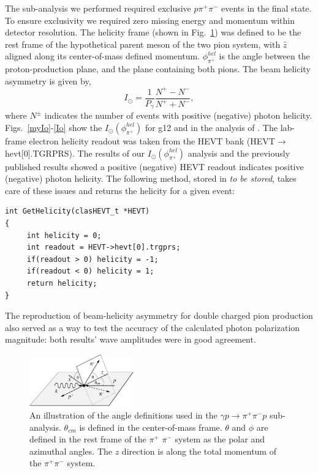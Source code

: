 The sub-analysis we performed required exclusive $p \pi^+ \pi^-$ events in the final state. To ensure exclusivity we required zero missing energy and momentum within detector resolution. The helicity frame (shown in Fig.~\ref{ioplane}) was defined to be the rest frame of the hypothetical parent meson of the two pion system, with  $\hat{z}$ aligned along its center-of-mass defined momentum. $\phi^{hel}_{\pi^+}$ is the angle between the proton-production plane, and the plane containing both pions. The beam helicity asymmetry is given by,
\begin{equation}
I_\odot = \frac{1}{P_{\gamma}} \frac{N^+ - N^-}{N^+ + N^-},
\end{equation}
where $N^\pm$ indicates the number of events with positive (negative) photon helicity.  Figs.~\ref{myIo}-\ref{Io} show the $I_{\odot}(\phi^{hel}_{\pi^+})$ for g12 and in the analysis of \cite{Io}.
The lab-frame electron helicity readout was taken from the HEVT bank (HEVT$\to$hevt[0].TGRPRS). The results of our $I_{\odot}(\phi^{hel}_{\pi^+})$ analysis and the previously published results showed a positive (negative) HEVT readout indicates positive (negative) photon helicity. The following method, stored in \textit{to be stored}, takes care of these issues and returns the helicity for a given event:
\begin{verbatim}
int GetHelicity(clasHEVT_t *HEVT)
{
     int helicity = 0;
     int readout = HEVT->hevt[0].trgprs;
     if(readout > 0) helicity = -1;
     if(readout < 0) helicity = 1;
     return helicity;
}
\end{verbatim}
The reproduction of beam-helicity asymmetry for double charged pion production also served as a way to test the accuracy of the calculated photon polarization magnitude: both results' wave amplitudes were in good agreement.

\begin{figure}[htpb]
\begin{center}
 \includegraphics[width=0.4\textwidth]{figures/calib/pol/ioplane.eps}
  \caption{An illustration of the angle definitions used in the $\gamma p \to \pi^+ \pi^- p$ sub-analysis. $\theta_{cm}$ is defined in the center-of-mass frame. $\theta$ and $\phi$ are defined in the rest frame of the $\pi^+$ $\pi^-$ system as the polar and azimuthal angles. The $z$ direction is along the total momentum of the $\pi^+ \pi^-$ system.}
  \label{ioplane}
  \end{center}
\end{figure}


